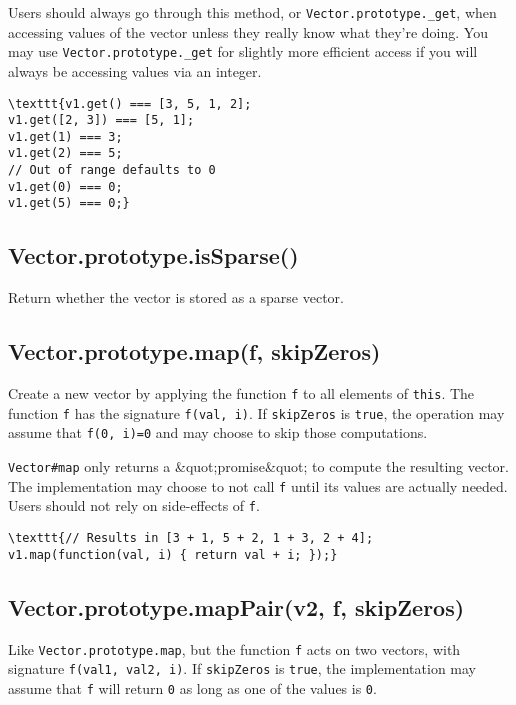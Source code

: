 \documentclass{article}
\begin{document}
Users should always go through this method, or \texttt{Vector.prototype.\_get}, when accessing
values of the vector unless they really know what they're doing.
You may use \texttt{Vector.prototype.\_get} for slightly more efficient access if you will always
be accessing values via an integer.


\begin{lstlisting}
\texttt{v1.get() === [3, 5, 1, 2];
v1.get([2, 3]) === [5, 1];
v1.get(1) === 3;
v1.get(2) === 5;
// Out of range defaults to 0
v1.get(0) === 0;
v1.get(5) === 0;}\end{lstlisting}

    \subsection*{Vector.prototype.isSparse()}
    Return whether the vector is stored as a sparse vector.


    \subsection*{Vector.prototype.map(f, skipZeros)}
    Create a new vector by applying the function \texttt{f} to all elements of \texttt{this}.
The function \texttt{f} has the signature \texttt{f(val, i)}.
If \texttt{skipZeros} is \texttt{true}, the operation may assume that \texttt{f(0, i)=0} and
may choose to skip those computations.


\texttt{Vector\#map} only returns a \&quot;promise\&quot; to compute the resulting vector.
The implementation may choose to not call \texttt{f} until its values
are actually needed. Users should not rely on side-effects of \texttt{f}.


\begin{lstlisting}
\texttt{// Results in [3 + 1, 5 + 2, 1 + 3, 2 + 4];
v1.map(function(val, i) { return val + i; });}\end{lstlisting}

    \subsection*{Vector.prototype.mapPair(v2, f, skipZeros)}
    Like \texttt{Vector.prototype.map}, but the function \texttt{f} acts on two vectors, with
signature \texttt{f(val1, val2, i)}. If \texttt{skipZeros} is \texttt{true}, the implementation may
assume that \texttt{f} will return \texttt{0} as long as one of the values is \texttt{0}.
\end{document}
